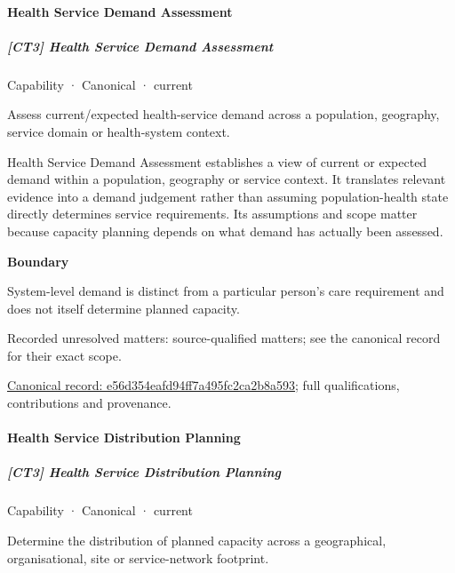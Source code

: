 \paragraph{Health Service Demand Assessment}

\subparagraph{[CT3] Health Service Demand Assessment}

\label{element:e56d354eafd94ff7a495fc2ca2b8a593}
{\small Capability · Canonical · current}\par

Assess current/expected health-service demand across a population, geography, service domain or health-system context.



Health Service Demand Assessment establishes a view of current or expected demand within a population, geography or service context. It translates relevant evidence into a demand judgement rather than assuming population-health state directly determines service requirements. Its assumptions and scope matter because capacity planning depends on what demand has actually been assessed.



\textbf{Boundary}



System-level demand is distinct from a particular person's care requirement and does not itself determine planned capacity.


{\small Recorded unresolved matters: source-qualified matters; see the canonical record for their exact scope.}\par
{\footnotesize \href{../../../../continuum/strategy/capability/e56d354eafd94ff7a495fc2ca2b8a593.md}{Canonical record: e56d354eafd94ff7a495fc2ca2b8a593}; full qualifications, contributions and provenance.}\par
\paragraph{Health Service Distribution Planning}

\subparagraph{[CT3] Health Service Distribution Planning}

\label{element:4fc525fccbe142a58ee43dcc58b11c92}
{\small Capability · Canonical · current}\par

Determine the distribution of planned capacity across a geographical, organisational, site or service-network footprint.



